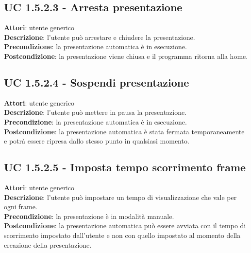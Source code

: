 	\subsection{UC 1.5.2.3 - Arresta presentazione}{
		\label{uc1.5.2.3}
		\textbf{Attori}: utente generico \\
		\textbf{Descrizione}: l'utente può arrestare e chiudere la presentazione. \\
		\textbf{Precondizione}: la presentazione automatica è in esecuzione.	\\
		\textbf{Postcondizione}: la presentazione viene chiusa e il programma ritorna alla home.	\\
	}
	\subsection{UC 1.5.2.4 - Sospendi presentazione}{
		\label{uc1.5.2.4}
		\textbf{Attori}: utente generico \\
		\textbf{Descrizione}: l'utente può mettere in pausa la presentazione. \\
		\textbf{Precondizione}: la presentazione automatica è in esecuzione.	\\
		\textbf{Postcondizione}: la presentazione automatica è stata fermata temporaneamente e potrà essere ripresa dallo stesso punto in qualsiasi momento.	\\
	}
	\subsection{UC 1.5.2.5 - Imposta tempo scorrimento frame}{
		\label{uc1.5.2.5}
		\textbf{Attori}: utente generico \\
		\textbf{Descrizione}: l'utente può impostare un tempo di visualizzazione che vale per ogni frame. \\
		\textbf{Precondizione}: la presentazione è in modalità manuale.	\\
		\textbf{Postcondizione}: la presentazione automatica può essere avviata con il tempo di scorrimento impostato dall'utente e non con quello impostato al momento della creazione della presentazione.	\\
	}
